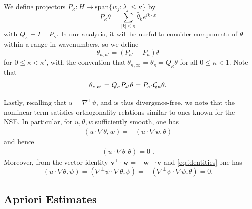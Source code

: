 \documentclass[twoside, reqno]{amsart}
\numberwithin{lemma}{section}
\numberwithin{theorem}{section}
\numberwithin{proposition}{section}
\numberwithin{equation}{section} %
\newcommand{\te}{\theta}
\newcommand{\ka}{\kappa}
\newcommand{\kap}{\kappa}
\newcommand{\tht}{\theta}
\newcommand{\bv}{\mathbf{v}}
\newcommand{\bw}{\mathbf{w}}
\begin{document}
We define projectors $P_{\kappa}: H \to \text{span}\{w_j : \lambda_j \leq \kappa\}$ by
\begin{equation} \label{proj:p}
    P_{\kappa}\te = \sum_{|k| \leq \kappa} \hat{\te}_ke^{ik\cdot x}
\end{equation}
with $Q_{\kappa}=I-P_{\kappa}$. {In our analysis, it will be useful to consider components of $\te$ within a range in wavenumbers, so we define}
\begin{equation*}
    \te_{\ka,\ka'} = (P_{\kappa'} - P_{\kappa})\te
\end{equation*}
for $0\leq \ka < \ka'$, with the convention that $\te_{\ka,\infty}=\te_{\ka}={Q_\ka\te}$ for all $0\leq \ka < 1$. {Note that}
    \begin{align}
        \tht_{\kap,\kap'}=Q_\kap P_{\kap'}\tht=P_{\kap'}Q_\kap\tht.\notag
    \end{align}



{Lastly, recalling that $u=\nabla^\perp\psi$, and %
is
thus divergence-free, we note that} the nonlinear term satisfies orthogonality relations similar to ones known for the NSE. In particular, for $u,\tht, w$ sufficiently smooth, one has
    \begin{align}\label{eq:identities}
        (u\cdotp\nabla\te,w) = -(u\cdotp\nabla w,\te)
    \end{align}
and hence
    \begin{align}\label{bterm_prod}
     (u\cdotp\nabla\te, \te)=0\;.
    \end{align}
Moreover, from the vector identity $\bv^\perp\cdot \bw=-\bw^\perp\cdot\bv$ and \eqref{eq:identities} one has
\begin{equation} \label{psi_orthog}
    (u\cdot\nabla \tht, \psi)=(\nabla^\perp \psi\cdot \nabla \tht, \psi)=-(\nabla^\perp \psi\cdot \nabla\psi, \tht) =0.
\end{equation}

\subsection{Apriori Estimates}
\end{document}
